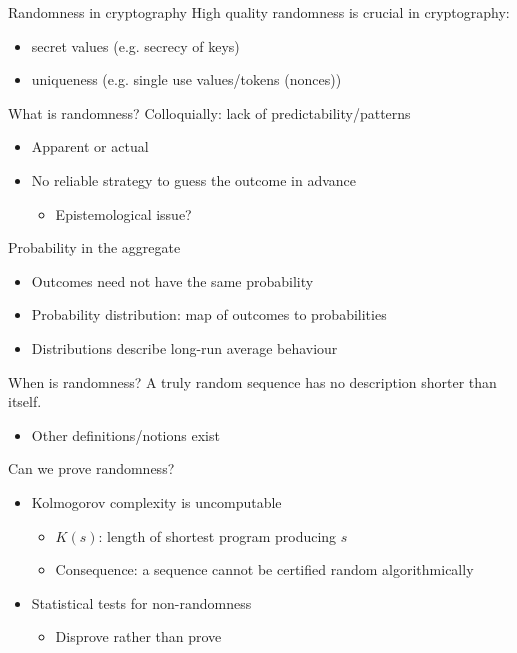 \begin{frame}{Randomness in cryptography}
  High quality randomness is crucial in cryptography:
  \begin{itemize}[<+(1)->]
    \item secret values (e.g. secrecy of keys)
    \item uniqueness (e.g. single use values/tokens (nonces))
  \end{itemize}
\end{frame}

\begin{frame}{What is randomness?}
  \pause
  Colloquially: lack of predictability/patterns
  \pause
  \begin{itemize}[<+(1)->]
    \item Apparent or actual
    \item No reliable strategy to guess the outcome in advance
    \begin{itemize}
      \item Epistemological issue?
    \end{itemize}
  \end{itemize}

  \vspace{1em}

  \pause
  Probability in the aggregate
  \begin{itemize}[<+(1)->]
    \item Outcomes need not have the same probability
    \item Probability distribution: map of outcomes to probabilities
    \item Distributions describe long-run average behaviour
  \end{itemize}
\end{frame}

\begin{frame}{When is randomness?}
  \pause
  A truly random sequence\pause{} has no description shorter than itself.
  \pause
  \begin{itemize}
    \item Other definitions/notions exist
  \end{itemize}

  \vspace{1em}

  \pause
  Can we prove randomness?
  \begin{itemize}[<+(1)->]
    \item Kolmogorov complexity is uncomputable
    \begin{itemize}
      \item $K(s)$: length of shortest program producing $s$
      \item Consequence: a sequence cannot be certified random algorithmically
    \end{itemize}
    \item Statistical tests for non-randomness
    \begin{itemize}
      \item Disprove rather than prove
    \end{itemize}
  \end{itemize}
\end{frame}

